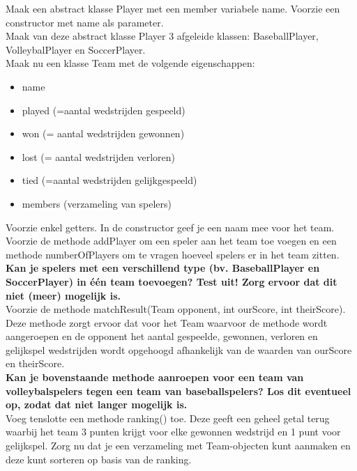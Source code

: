 \begin{oefening}
Maak een abstract klasse Player met een member variabele name. Voorzie een constructor met name als parameter. 
\\

Maak van deze abstract klasse Player 3 afgeleide klassen: BaseballPlayer, VolleybalPlayer en SoccerPlayer.
\\

Maak nu een klasse Team met de volgende eigenschappen: 
\begin{itemize}
\item name
\item played (=aantal wedstrijden gespeeld)
\item won (= aantal wedstrijden gewonnen)
\item lost (= aantal wedstrijden verloren)
\item tied (=aantal wedstrijden gelijkgespeeld) 
\item members (verzameling van spelers)
\end{itemize}
Voorzie enkel getters. In de constructor geef je  een naam mee voor het team.
\\

Voorzie de methode addPlayer om een speler aan het team toe voegen en een methode
numberOfPlayers om te vragen hoeveel spelers er in het team zitten.
\\

\textbf{Kan je spelers met een verschillend type (bv. BaseballPlayer en SoccerPlayer) in één team
toevoegen? Test uit! Zorg ervoor dat dit niet (meer) mogelijk is.}
\\

Voorzie de methode matchResult(Team opponent, int ourScore, int theirScore). Deze methode zorgt ervoor dat voor het Team waarvoor de methode wordt aangeroepen en de opponent het aantal gespeelde, gewonnen, verloren en gelijkspel wedstrijden wordt opgehoogd afhankelijk van de waarden van ourScore en theirScore.
\\

\textbf{Kan je bovenstaande methode aanroepen voor een team van volleybalspelers tegen een team van baseballspelers? Los dit eventueel op, zodat dat niet langer mogelijk is.}
\\

Voeg tenslotte een methode ranking() toe. Deze geeft een geheel getal terug waarbij het team 3 punten krijgt voor elke gewonnen wedstrijd en 1 punt voor gelijkspel.
Zorg nu dat je een verzameling met Team-objecten kunt aanmaken en deze kunt sorteren op basis van de ranking.
\end{oefening}






